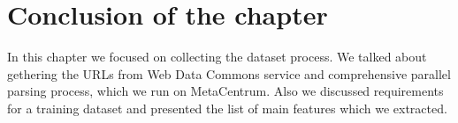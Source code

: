 \section*{Conclusion of the chapter}

In this chapter we focused on collecting the dataset process. We talked about gethering the URLs from Web Data Commons service and comprehensive parallel parsing process, which we run on MetaCentrum. Also we discussed requirements for a training dataset and presented the list of main features which we extracted. 
